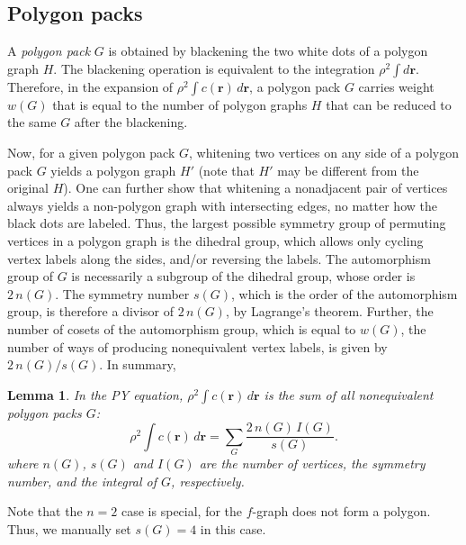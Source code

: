 \documentclass[aip,jcp,reprint,superscriptaddress]{revtex4-1}
\newtheorem{lemm}[thrm]{Lemma}
\newcommand{\vct}[1]{\mathbf{#1}}
\providecommand{\vr}{} %
\renewcommand{\vr}{\vct{r}}
\begin{document}
\subsection{Polygon packs}



A \emph{polygon pack} $G$ is obtained
  by blackening the two white dots of a polygon graph $H$.
%
The blackening operation is equivalent to the integration $\rho^2 \int d\vr$.
%
Therefore, in the expansion of $\rho^2 \int c(\vr) \, d\vr$,
  a polygon pack $G$ carries weight $w(G)$
  that is equal to the number of polygon graphs $H$ that
  can be reduced to the same $G$ after the blackening.

Now, for a given polygon pack $G$,
  whitening two vertices on any side of
  a polygon pack $G$
  yields a polygon graph $H'$
  (note that $H'$ may be different from the original $H$).
%
One can further show that
  whitening a nonadjacent pair of vertices always yields
  a non-polygon graph with intersecting edges,
  no matter how the black dots are labeled.
%
Thus,
  the largest possible symmetry group of
  permuting vertices in a polygon graph
  is the dihedral group,
  which allows only cycling vertex labels along the sides,
  and/or reversing the labels.
%
The automorphism group of $G$
  is necessarily a subgroup of the dihedral group,
  whose order is $2 \, n(G)$.
%
The symmetry number $s(G)$,
  which is the order of the automorphism group,
  is therefore a divisor of $2 \, n(G)$,
  by Lagrange's theorem.
%
Further,
  the number of cosets of the automorphism group,
  which is equal to $w(G)$, the number of ways of
  producing nonequivalent vertex labels,
  is given by $2 \, n(G) / s(G)$.
%
In summary,
\begin{lemm}
In the PY equation,
  $\rho^2 \int c(\vr) \, d\vr$ is the sum of
  all nonequivalent polygon packs $G$:
  \begin{equation}
      \rho^2 \int c(\vr) \, d\vr
    = \sum_{G} \frac{ 2 \, n(G) \, I(G) }{ s(G) }.
  \label{eq:pykappasum}
  \end{equation}
  where $n(G)$, $s(G)$ and $I(G)$ are
  the number of vertices,
  the symmetry number,
  and the integral of $G$,
  respectively.
  \label{thm:pykappasum}
\end{lemm}
%
Note that the $n = 2$ case is special,
  for the $f$-graph does not form a polygon.
Thus, we manually set $s(G) = 4$ in this case.
\end{document}
